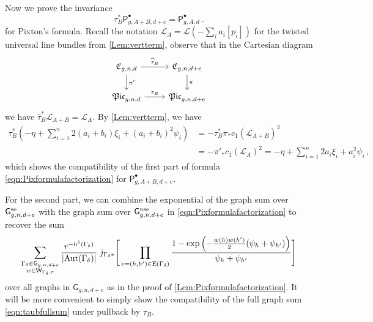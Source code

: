 \documentclass[a4paper,12pt]{article} %
\newcommand{\ca}[1]{{\mathcal{#1}}}
\def\P{\mathsf{P}}
\def\Aut{{\rm Aut}}
\def\E{\mathrm{E}}
\def\V{\mathrm{V}}
\def\G{\mathsf{G}}
\theoremstyle{definition}
\theoremstyle{plain}%
\newtheorem{lemma}[definition]{Lemma}
\newcommand{\Picabs}{\mathfrak{Pic}}
\begin{document}


Now we prove the invariance
\begin{equation} \label{eqn:varying_A_for_P}
    \tau_B^* \P_{g,A+B,d+e}^\bullet = \P_{g,A,d}^\bullet\ .
\end{equation}
for Pixton's formula.
Recall the notation $\ca L_A = \ca L(- \sum_i a_i [p_i])$ for the twisted universal line bundles from  \cref{Lem:vertterm}, observe that in the Cartesian diagram
\[
\begin{tikzcd}
\frak C_{g,n,d} \arrow[r,"\widehat \tau_B"] \arrow[d,"\pi'"] & \frak C_{g,n,d+e} \arrow[d,"\pi"]\\
\Picabs_{g,n,d} \arrow[r,"\tau_B"] & \Picabs_{g,n,d+e}
\end{tikzcd}
\]
we have $\widehat \tau_B^* \ca L_{A+B} = \ca L_{A}$. By \cref{Lem:vertterm}, we have
\begin{align*}
\tau_B^*(-\eta + \sum_{i=1}^n 2 (a_i+b_i) \xi_i+ (a_i+b_i)^2 \psi_i) &= - \tau_B^*\pi_* c_1(\mathcal{L}_{A+B})^2\\
&=- \pi'_* c_1(\mathcal{L}_{A})^2 = -\eta + \sum_{i=1}^n 2 a_i \xi_i+ a_i^2 \psi_i\, ,
\end{align*}
which shows the compatibility of the first part of formula \eqref{eqn:Pixformulafactorization} for $\P_{g,A+B,d+e}^\bullet$.

For the second part, we can combine the exponential of the graph sum over $\G_{g,n,d+e}^\textup{se}$ with the graph sum over $\G_{g,n,d+e}^\textup{nse}$ 
in \eqref{eqn:Pixformulafactorization}
to recover the sum
\begin{equation} \label{eqn:taubfullsum}
    \sum_{
\substack{\Gamma_\delta\in \G_{g,n,d+e} \\
w\in \mathsf{W}_{\Gamma_\delta,r}}
}
\frac{r^{-h^1(\Gamma_\delta)}}{|\Aut(\Gamma_\delta)| }
\;
j_{\Gamma_\delta*}\Bigg[
\prod_{e=(h,h')\in \E(\Gamma_\delta)}
\frac{1-\exp\left(-\frac{w(h)w(h')}2(\psi_h+\psi_{h'})\right)}{\psi_h + \psi_{h'}} \Bigg]
\end{equation}
over all graphs in $\G_{g,n,d+e}$ as in the proof of \cref{Lem:Pixformulafactorization}. It will be more convenient to simply show the compatibility of the full graph sum \eqref{eqn:taubfullsum} under pullback by $\tau_B$.
\end{document}
